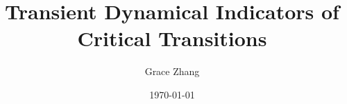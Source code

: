 \documentclass[]{article}
\title{Transient Dynamical Indicators of Critical Transitions}
\author{Grace Zhang}
\date{\today}
\theoremstyle{plain}
\theoremstyle{definition}
\begin{document}
	\maketitle
	
	\begin{abstract}
		
	\end{abstract}

	\tableofcontents
	
	
    \newpage	
    
    
    
    
    
    
    
    
    
    
    
   
    
    \newpage
	

	
\end{document}

